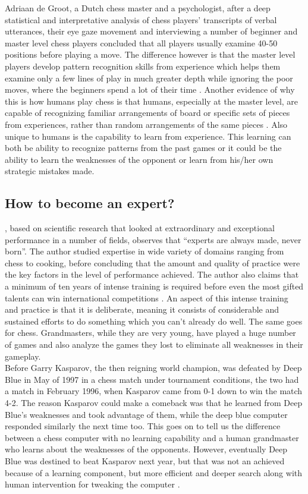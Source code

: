 Adriaan de Groot, a Dutch chess master and a psychologist, after a deep 
statistical and interpretative analysis of chess players' transcripts of verbal 
utterances, their eye gaze movement and interviewing a number of beginner and 
master level chess players concluded that all players usually examine 40-50 
positions before playing a move. The difference however 
is that the master level players develop pattern recognition skills from 
experience which helps them examine only a few lines of play in much greater 
depth while ignoring the poor moves, where the beginners spend a lot of their 
time \cite{de1996perception}. Another evidence of why this is how humans 
play chess is that humans, especially at the master level, are capable of 
recognizing familiar arrangements of board or specific sets of pieces 
from experiences, rather than random arrangements of the same pieces  
\cite{chase1973perception}. Also unique to humans is the capability to learn 
from experience. This learning can both be ability to recognize patterns from 
the past games or it could be the ability to learn the weaknesses of the 
opponent or learn from his/her own strategic mistakes made.

\subsection{How to become an expert?}
\citet{ericsson2007making}, based on scientific research that 
looked at extraordinary and exceptional performance in a number of fields, 
observes that ``experts are always made, never born''. The author studied 
expertise in 
wide variety of domains ranging from chess to cooking, before concluding that 
the amount and quality of practice were the key factors in the level of 
performance achieved. The author also claims that a minimum of ten years of 
intense training is required before even the most gifted talents can 
win international competitions \cite{ericsson2006cambridge}. An aspect of this 
intense training and practice is that it is deliberate, meaning it 
consists of considerable and sustained efforts to do something which you can't 
already do well. The same goes for chess. Grandmasters, while they are very 
young, have played a huge number of games and also analyze the games they lost 
to eliminate all weaknesses in their gameplay.\\

Before Garry Kasparov, the then reigning world champion, was defeated by Deep 
Blue \cite{campbell2002deep} in May of 1997 in a chess match under tournament 
conditions, the two had a match in February 1996, when Kasparov came from 0-1 
down to win the match 4-2. The reason Kasparov could make a comeback was that 
he learned from Deep Blue's weaknesses and took advantage of them, while the 
deep blue computer responded similarly the next time too. This goes on to tell 
us the difference between a chess computer with no learning capability and a 
human grandmaster who learns about the weaknesses of the opponents. However, 
eventually Deep Blue was destined to beat Kasparov next year, but that was not 
an achieved because of a learning component, but more efficient and deeper 
search along with human intervention for tweaking the computer \cite{cnn-news}. 

